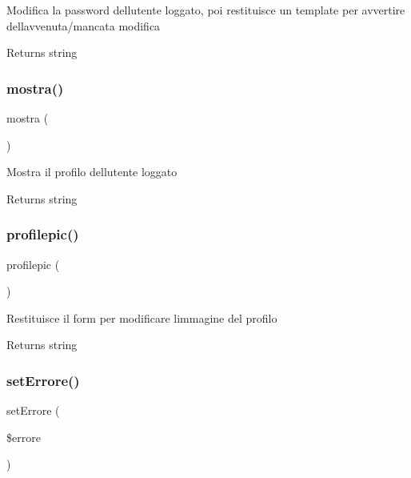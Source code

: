 Modifica la password dell\textquotesingle{}utente loggato, poi restituisce un template per avvertire dell\textquotesingle{}avvenuta/mancata modifica

\begin{DoxyReturn}{Returns}
string 
\end{DoxyReturn}
\mbox{\label{class_c_utente_a67a2a3bf6a01618020c3dcb546b9f5d8}} 
\subsubsection{\texorpdfstring{mostra()}{mostra()}}
{\footnotesize\ttfamily mostra (\begin{DoxyParamCaption}{ }\end{DoxyParamCaption})}

Mostra il profilo dell\textquotesingle{}utente loggato

\begin{DoxyReturn}{Returns}
string 
\end{DoxyReturn}
\mbox{\label{class_c_utente_a435511048d4049456f0c24c988a9c628}} 
\subsubsection{\texorpdfstring{profilepic()}{profilepic()}}
{\footnotesize\ttfamily profilepic (\begin{DoxyParamCaption}{ }\end{DoxyParamCaption})}

Restituisce il form per modificare l\textquotesingle{}immagine del profilo

\begin{DoxyReturn}{Returns}
string 
\end{DoxyReturn}
\mbox{\label{class_c_utente_a9c4c3362aa5a2db624792c7cf90711e2}} 
\subsubsection{\texorpdfstring{set\+Errore()}{setErrore()}}
{\footnotesize\ttfamily set\+Errore (\begin{DoxyParamCaption}\item[{}]{\$errore }\end{DoxyParamCaption})}

